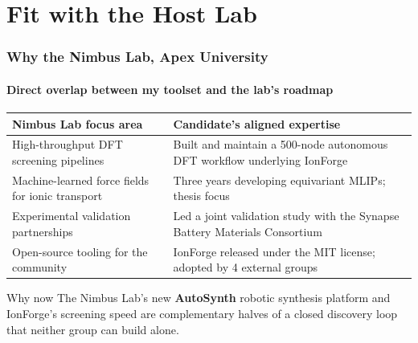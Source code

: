 \section{Fit with the Host Lab}

\begin{frame}
\frametitle{Why the Nimbus Lab, Apex University}
\framesubtitle{Direct overlap between my toolset and the lab's roadmap}

\small
\begin{tabularx}{\linewidth}{@{}X X@{}}
\toprule
Nimbus Lab focus area & Candidate's aligned expertise \\
\midrule
High-throughput DFT screening pipelines & Built and maintain a 500-node autonomous DFT workflow underlying IonForge \\
Machine-learned force fields for ionic transport & Three years developing equivariant MLIPs; thesis focus \\
Experimental validation partnerships & Led a joint validation study with the Synapse Battery Materials Consortium \\
Open-source tooling for the community & IonForge released under the MIT license; adopted by 4 external groups \\
\bottomrule
\end{tabularx}

\vspace{0.4cm}
\begin{block}{Why now}
The Nimbus Lab's new \textbf{AutoSynth} robotic synthesis platform and IonForge's screening speed are complementary halves of a closed discovery loop that neither group can build alone.
\end{block}
\end{frame}

